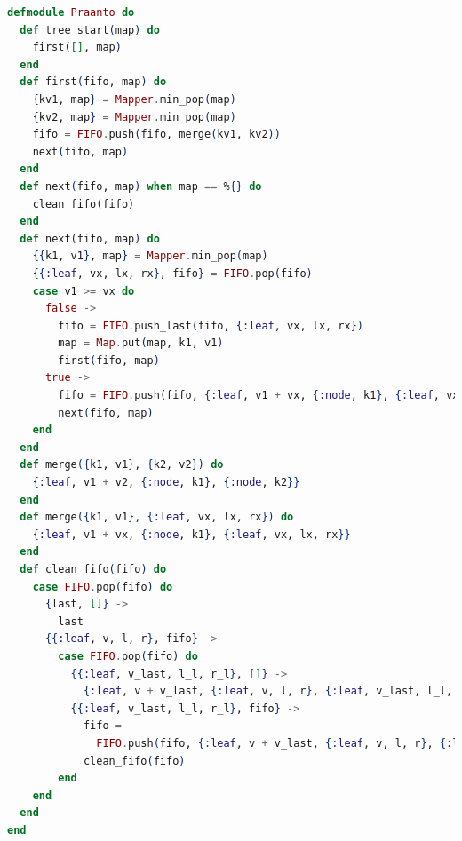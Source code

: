 \pagebreak
\begin{lstlisting}[language=Elixir, title=Smart way to generate the tree]
defmodule Praanto do
  def tree_start(map) do
    first([], map)
  end
  def first(fifo, map) do
    {kv1, map} = Mapper.min_pop(map)
    {kv2, map} = Mapper.min_pop(map)
    fifo = FIFO.push(fifo, merge(kv1, kv2))
    next(fifo, map)
  end
  def next(fifo, map) when map == %{} do
    clean_fifo(fifo)
  end
  def next(fifo, map) do
    {{k1, v1}, map} = Mapper.min_pop(map)
    {{:leaf, vx, lx, rx}, fifo} = FIFO.pop(fifo)
    case v1 >= vx do
      false ->
        fifo = FIFO.push_last(fifo, {:leaf, vx, lx, rx})
        map = Map.put(map, k1, v1)
        first(fifo, map)
      true ->
        fifo = FIFO.push(fifo, {:leaf, v1 + vx, {:node, k1}, {:leaf, vx, lx, rx}})
        next(fifo, map)
    end
  end
  def merge({k1, v1}, {k2, v2}) do
    {:leaf, v1 + v2, {:node, k1}, {:node, k2}}
  end
  def merge({k1, v1}, {:leaf, vx, lx, rx}) do
    {:leaf, v1 + vx, {:node, k1}, {:leaf, vx, lx, rx}}
  end
  def clean_fifo(fifo) do
    case FIFO.pop(fifo) do
      {last, []} ->
        last
      {{:leaf, v, l, r}, fifo} ->
        case FIFO.pop(fifo) do
          {{:leaf, v_last, l_l, r_l}, []} ->
            {:leaf, v + v_last, {:leaf, v, l, r}, {:leaf, v_last, l_l, r_l}}
          {{:leaf, v_last, l_l, r_l}, fifo} ->
            fifo =
              FIFO.push(fifo, {:leaf, v + v_last, {:leaf, v, l, r}, {:leaf, v_last, l_l, r_l}})
            clean_fifo(fifo)
        end
    end
  end
end
\end{lstlisting}